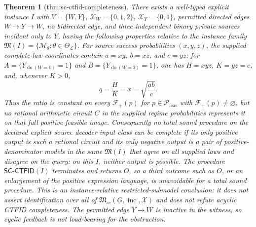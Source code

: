 \documentclass{article}
\newtheorem{theorem}{Theorem}
\begin{document}
\begin{theorem}[thm:sc-ctfid-completeness]\label{thm:sc-ctfid-completeness}
There exists a well-typed explicit instance \(I\) with \(V=\{W,Y\}\), \(\mathcal X_W=\{0,1,2\}\), \(\mathcal X_Y=\{0,1\}\), permitted directed edges \(W\to Y\to W\), no bidirected edge, and three independent binary private sources incident only to \(Y\), having the following properties relative to the instance family \(\mathfrak M(I)=\{\mathcal M_\theta:\theta\in\Theta_{\mathcal L}\}\).  For source success probabilities \((x,y,z)\), the supplied complete-law coordinates contain \(a=xy\), \(b=xz\), and \(c=yz\); for \(A=\{Y_{\operatorname{do}(W=0)}=1\}\) and \(B=\{Y_{\operatorname{do}(W=2)}=1\}\), one has \(H=xyz\), \(K=yz=c\), and, whenever \(K>0\),
\[
 q=\frac{H}{K}=x=\sqrt{\frac{ab}{c}}.
\]
Thus the ratio is constant on every \(\mathcal F_+(p)\) for \(p\in\mathcal P_{\mathrm{feas}}\) with \(\mathcal F_+(p)\neq\varnothing\), but no rational arithmetic circuit \(C\) in the supplied regime probabilities represents it on that full positive feasible image.  Consequently no total sound procedure on the declared explicit source-decoder input class can be complete if its only positive output is such a rational circuit and its only negative output is a pair of positive-denominator models in the same \(\mathfrak M(I)\) that agree on all supplied laws and disagree on the query: on this \(I\), neither output is possible.  The procedure \(\mathsf{SC\mbox{-}CTFID}(I)\) terminates and returns \(O\), so a third outcome such as \(O\), or an enlargement of the positive expression language, is unavoidable for a total sound procedure.  This is an instance-relative restricted-submodel conclusion: it does not assert identification over all of \(\mathfrak M_{sc}(G,\operatorname{inc},\mathcal X)\) and does not refute acyclic CTFID completeness.  The permitted edge \(Y\to W\) is inactive in the witness, so cyclic feedback is not load-bearing for the obstruction.
\end{theorem}
\end{document}
